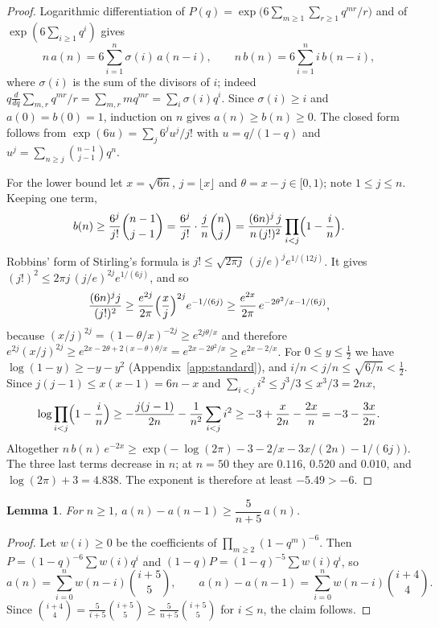 \documentclass[11pt]{amsart}
\newtheorem{lemma}[theorem]{Lemma}
\theoremstyle{definition}
\begin{document}
\begin{proof}
Logarithmic differentiation of $P(q)=\exp\bigl(6\sum_{m\ge1}\sum_{r\ge1}q^{mr}/r\bigr)$ and of $\exp(6\sum_{i\ge1}q^i)$ gives
\[
n\,a(n)=6\sum_{i=1}^n\sigma(i)\,a(n-i),\qquad n\,b(n)=6\sum_{i=1}^n i\,b(n-i),
\]
where $\sigma(i)$ is the sum of the divisors of $i$; indeed $q\frac d{dq}\sum_{m,r}q^{mr}/r=\sum_{m,r}mq^{mr}=\sum_i\sigma(i)q^i$. Since $\sigma(i)\ge i$ and $a(0)=b(0)=1$, induction on $n$ gives $a(n)\ge b(n)\ge0$. The closed form follows from $\exp(6u)=\sum_j6^ju^j/j!$ with $u=q/(1-q)$ and $u^j=\sum_{n\ge j}\binom{n-1}{j-1}q^n$.

For the lower bound let $x=\sqrt{6n}$, $j=\lfloor x\rfloor$ and $\theta=x-j\in[0,1)$; note $1\le j\le n$. Keeping one term,
\[
b(n)\ge\frac{6^j}{j!}\binom{n-1}{j-1}=\frac{6^j}{j!}\cdot\frac jn\binom nj=\frac{(6n)^j\,j}{n\,(j!)^2}\prod_{i<j}\Bigl(1-\frac in\Bigr).
\]
Robbins' form of Stirling's formula \cite{Rob55} is $j!\le\sqrt{2\pi j}\,(j/e)^je^{1/(12j)}$. It gives $(j!)^2\le 2\pi j\,(j/e)^{2j}e^{1/(6j)}$, and so
\[
\frac{(6n)^j j}{(j!)^2}\ge\frac{e^{2j}}{2\pi}\Bigl(\frac xj\Bigr)^{2j}e^{-1/(6j)}\ge \frac{e^{2x}}{2\pi}\,e^{-2\theta^2/x-1/(6j)},
\]
because $(x/j)^{2j}=(1-\theta/x)^{-2j}\ge e^{2j\theta/x}$ and therefore $e^{2j}(x/j)^{2j}\ge e^{2x-2\theta+2(x-\theta)\theta/x}=e^{2x-2\theta^2/x}\ge e^{2x-2/x}$. For $0\le y\le\frac12$ we have $\log(1-y)\ge-y-y^2$ (Appendix~\ref{app:standard}), and $i/n<j/n\le\sqrt{6/n}<\frac12$. Since $j(j-1)\le x(x-1)=6n-x$ and $\sum_{i<j}i^2\le j^3/3\le x^3/3=2nx$,
\[
\log\prod_{i<j}\Bigl(1-\frac in\Bigr)\ge-\frac{j(j-1)}{2n}-\frac{1}{n^2}\sum_{i<j}i^2\ge-3+\frac{x}{2n}-\frac{2x}{n}=-3-\frac{3x}{2n}.
\]
Altogether $n\,b(n)\,e^{-2x}\ge\exp\bigl(-\log(2\pi)-3-2/x-3x/(2n)-1/(6j)\bigr)$. The three last terms decrease in $n$; at $n=50$ they are $0.116$, $0.520$ and $0.010$, and $\log(2\pi)+3=4.838$. The exponent is therefore at least $-5.49>-6$.
\end{proof}

\begin{lemma}\label{lem:diff}
For $n\ge1$, $a(n)-a(n-1)\ge \dfrac{5}{n+5}\,a(n)$.
\end{lemma}

\begin{proof}
Let $w(i)\ge0$ be the coefficients of $\prod_{m\ge2}(1-q^m)^{-6}$. Then $P=(1-q)^{-6}\sum w(i)q^i$ and $(1-q)P=(1-q)^{-5}\sum w(i)q^i$, so
\[
a(n)=\sum_{i=0}^nw(n-i)\binom{i+5}{5},\qquad a(n)-a(n-1)=\sum_{i=0}^nw(n-i)\binom{i+4}{4}.
\]
Since $\binom{i+4}4=\frac5{i+5}\binom{i+5}5\ge\frac5{n+5}\binom{i+5}5$ for $i\le n$, the claim follows.
\end{proof}
\end{document}
